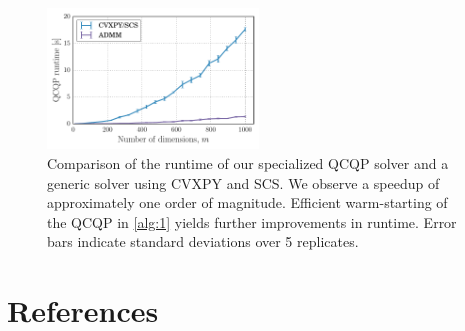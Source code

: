 \documentclass[aip, jcp, reprint, nolinenumbers, twocolumn, nobalancelastpage, nofootinbib]{revtex4-1}
\begin{document}
\begin{figure}
    \includegraphics[width=0.5\textwidth]{runtime-performance.pdf}
    \caption{\label{fig:timing} Comparison of the runtime of our specialized QCQP solver and a generic solver using CVXPY and SCS.\cite{cvxpy, o2013operator} We observe a speedup of approximately one order of magnitude. Efficient warm-starting of the QCQP in \cref{alg:1} yields further improvements in runtime. Error bars indicate standard deviations over 5 replicates.}
\end{figure}


\section*{References}

\end{document}

